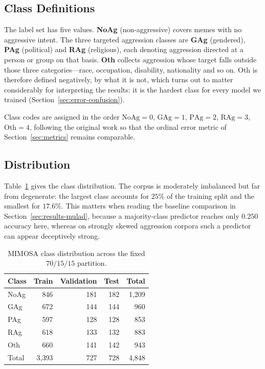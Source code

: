 \documentclass[conference]{IEEEtran}
\begin{document}
\subsection{Class Definitions}

The label set has five values. \textbf{NoAg} (non-aggressive) covers memes with
no aggressive intent. The three targeted aggression classes are \textbf{GAg}
(gendered), \textbf{PAg} (political) and \textbf{RAg} (religious), each denoting
aggression directed at a person or group on that basis. \textbf{Oth} collects
aggression whose target falls outside those three categories---race,
occupation, disability, nationality and so on. Oth is therefore defined
negatively, by what it is not, which turns out to matter considerably for
interpreting the results: it is the hardest class for every model we trained
(Section~\ref{sec:error-confusion}).

Class codes are assigned in the order $\mathrm{NoAg}=0$, $\mathrm{GAg}=1$,
$\mathrm{PAg}=2$, $\mathrm{RAg}=3$, $\mathrm{Oth}=4$, following the original
work so that the ordinal error metric of Section~\ref{sec:metrics} remains
comparable.

\subsection{Distribution}

Table~\ref{tab:dataset} gives the class distribution. The corpus is moderately
imbalanced but far from degenerate: the largest class accounts for $25\%$ of the
training split and the smallest for $17.6\%$. This matters when reading the
baseline comparison in Section~\ref{sec:results-mulad}, because a majority-class
predictor reaches only $0.250$ accuracy here, whereas on strongly skewed
aggression corpora such a predictor can appear deceptively strong.

\begin{table}[t]
\caption{MIMOSA class distribution across the fixed $70/15/15$ partition.}
\label{tab:dataset}
\centering
\small
\begin{tabular}{lrrrr}
\toprule
Class & Train & Validation & Test & Total \\
\midrule
NoAg  & 846 & 181 & 182 & 1{,}209 \\
GAg   & 672 & 144 & 144 & \phantom{0}960 \\
PAg   & 597 & 128 & 128 & \phantom{0}853 \\
RAg   & 618 & 133 & 132 & \phantom{0}883 \\
Oth   & 660 & 141 & 142 & \phantom{0}943 \\
\midrule
Total & 3{,}393 & 727 & 728 & 4{,}848 \\
\bottomrule
\end{tabular}
\end{table}
\end{document}
